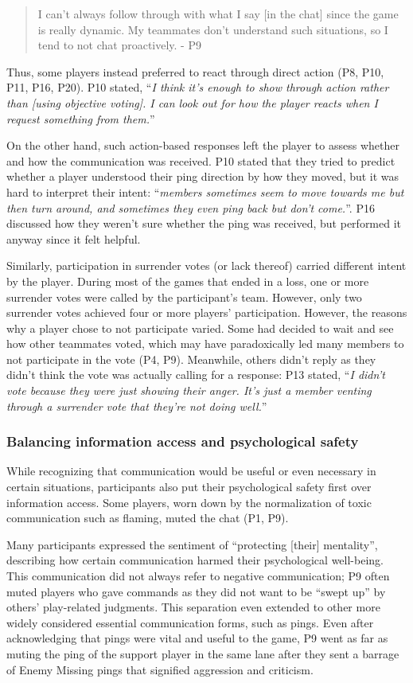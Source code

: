 \begin{quote}
I can't always follow through with what I say [in the chat] since the game is really dynamic. My teammates don't understand such situations, so I tend to not chat proactively. - P9
\end{quote}

Thus, some players instead preferred to react through direct action (P8, P10, P11, P16, P20). P10 stated, ``\textit{I think it's enough to show through action rather than [using objective voting]. I can look out for how the player reacts when I request something from them.}''

On the other hand, such action-based responses left the player to assess whether and how the communication was received. P10 stated that they tried to predict whether a player understood their ping direction by how they moved, but it was hard to interpret their intent: ``\textit{members sometimes seem to move towards me but then turn around, and sometimes they even ping back but don't come.}''. P16 discussed how they weren't sure whether the ping was received, but performed it anyway since it felt helpful.

Similarly, participation in surrender votes (or lack thereof) carried different intent by the player. During most of the games that ended in a loss, one or more surrender votes were called by the participant's team. However, only two surrender votes achieved four or more players' participation. However, the reasons why a player chose to not participate varied. Some had decided to wait and see how other teammates voted, which may have paradoxically led many members to not participate in the vote (P4, P9). Meanwhile, others didn't reply as they didn't think the vote was actually calling for a response: P13 stated, ``\textit{I didn't vote because they were just showing their anger. It's just a member venting through a surrender vote that they're not doing well.}''

\subsubsection{Balancing information access and psychological safety}
While recognizing that communication would be useful or even necessary in certain situations, participants also put their psychological safety first over information access. Some players, worn down by the normalization of toxic communication such as flaming, muted the chat (P1, P9).

Many participants expressed the sentiment of ``protecting [their] mentality'', describing how certain communication harmed their psychological well-being. This communication did not always refer to negative communication; P9 often muted players who gave commands as they did not want to be ``swept up'' by others' play-related judgments. This separation even extended to other more widely considered essential communication forms, such as pings. Even after acknowledging that pings were vital and useful to the game, P9 went as far as muting the ping of the support player in the same lane after they sent a barrage of Enemy Missing pings that signified aggression and criticism. 

